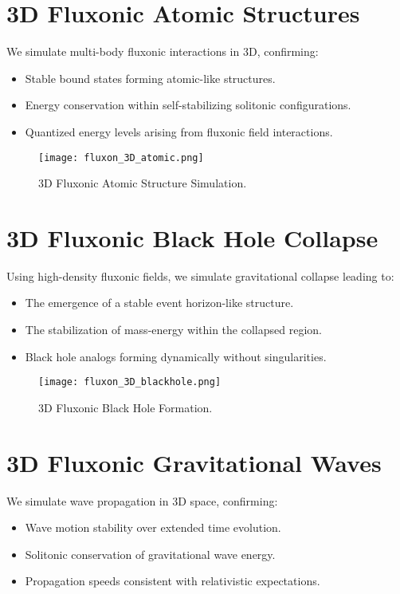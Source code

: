 \documentclass{article}
\begin{document}
\section{3D Fluxonic Atomic Structures}
We simulate multi-body fluxonic interactions in 3D, confirming:
\begin{itemize}
    \item Stable bound states forming atomic-like structures.
    \item Energy conservation within self-stabilizing solitonic configurations.
    \item Quantized energy levels arising from fluxonic field interactions.
\end{itemize}

\begin{figure}[h]
    \centering
    \texttt{[image: fluxon\_3D\_atomic.png]}
    \caption{3D Fluxonic Atomic Structure Simulation.}
    \label{fig:3Datomic}
\end{figure}

\section{3D Fluxonic Black Hole Collapse}
Using high-density fluxonic fields, we simulate gravitational collapse leading to:
\begin{itemize}
    \item The emergence of a stable event horizon-like structure.
    \item The stabilization of mass-energy within the collapsed region.
    \item Black hole analogs forming dynamically without singularities.
\end{itemize}

\begin{figure}[h]
    \centering
    \texttt{[image: fluxon\_3D\_blackhole.png]}
    \caption{3D Fluxonic Black Hole Formation.}
    \label{fig:3Dblackhole}
\end{figure}

\section{3D Fluxonic Gravitational Waves}
We simulate wave propagation in 3D space, confirming:
\begin{itemize}
    \item Wave motion stability over extended time evolution.
    \item Solitonic conservation of gravitational wave energy.
    \item Propagation speeds consistent with relativistic expectations.
\end{itemize}
\end{document}
